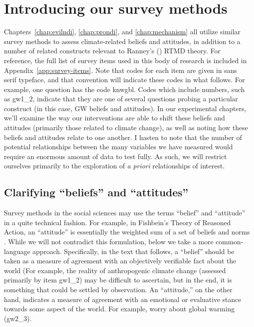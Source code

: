 \graphicspath{{survey-methods/}}

\chapter{Introducing our survey methods}
\label{chap:survey}

Chapters~\ref{chap:evilndi}, \ref{chap:prondi}, and \ref{chap:mechanism} all
utilize similar survey methods to assess climate-related beliefs and attitudes,
in addition to a number of related constructs relevant to Ranney's
(\citeyear{ranney_why_2012}) RTMD theory. For reference, the full list of survey
items used in this body of research is included in
Appendix~\ref{app:survey-items}. Note that codes for each item are given in
\textsf{sans serif} typeface, and that convention will indicate these codes in
what follows. For example, one question has the code \textsf{knwgbl}. Codes
which include numbers, such as \textsf{gw1_2}, indicate that they are one of
several questions probing a particular construct (in this case, GW beliefs and
attitudes).  In our experimental chapters, we'll examine the way our
interventions are able to shift these beliefs and attitudes (primarily those
related to climate change), as well as noting how these beliefs and attitudes
relate to one another.  I hasten to note that the number of potential
relationships between the many variables we have measured would require an
enormous amount of data to test fully. As such, we will restrict ourselves
primarily to the exploration of \emph{a priori} relationships of interest.

\section{Clarifying \texorpdfstring{“beliefs”}{"beliefs"} and
    \texorpdfstring{“attitudes”}{"attitudes"}}

Survey methods in the social sciences may use the terms “belief” and “attitude”
in a quite technical fashion. For example, in Fishbein's Theory of Reasoned
Action, an “attitude” is essentially the weighted sum of a set of beliefs and
norms \parencite[see][for an overview of such theories]{montano_theory_2008}.
While we will not contradict this formulation, below we take a more
common-language approach. Specifically, in the text that follows, a “belief”
should be taken as a measure of agreement with an objectively verifiable fact
about the world (For example, the reality of anthropogenic climate
change (assessed primarily by item \textsf{gw1_2}) may be difficult to
ascertain, but in the end, it is something that could be settled by observation.
An “attitude,” on the other hand, indicates a measure of agreement with an
emotional or evaluative stance towards some aspect of the world.  For example,
worry about global warming (\textsf{gw2_3}).


